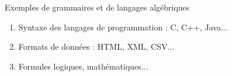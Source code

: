 \begin{frame}{Exemples de grammaires et de langages algébriques}
\begin{enumerate}
  \item Syntaxe des langages de programmation : C, C++, Java...\vspace{2mm}
    
  \item Formats de données : HTML, XML, CSV...\vspace{2mm}
    
  \item Formules logiques, mathématiques...
  \end{enumerate}

\end{frame}

\endgroup
\endinput
